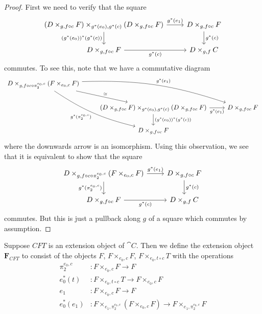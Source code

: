 \begin{proof}
First we need to verify that the square
\begin{equation*}
\begin{tikzcd}
(D\times_{g,f\circ c} F) \times_{g^\ast(e_0),g^\ast(c)} (D\times_{g,f\circ c} F)
  \ar{r}{g^\ast(e_1)} 
  \ar{d}[swap]{(g^\ast(e_0))^\ast(g^\ast(c))} 
  & 
D\times_{g,f\circ c} F
  \ar{d}{g^\ast(c)}
  \\
D\times_{g,f\circ c} F
  \ar{r}[swap]{g^\ast(c)} 
  & 
D\times_{g,f} C
\end{tikzcd}
\end{equation*}
commutes. To see this, note that we have a commutative diagram
\begin{equation*}
\begin{tikzcd}
D\times_{g,f\circ c\circ \pi_2^{e_0,c}}(F\times_{e_0,c} F)  
  \ar[bend right=10]{ddr}[swap]{g^\ast(\pi_2^{e_0,c})}
  \ar[bend left=10]{drr}{g^\ast(e_1)}
  \ar{dr}{\simeq}
  \\
  {}
  &
(D\times_{g,f\circ c} F)\times_{g^\ast(e_0),g^\ast(c)}(D\times_{g,f\circ c} F)
  \ar{r}[swap]{g^\ast(e_1)}
  \ar{d}{(g^\ast(e_0))^\ast(g^\ast(c))}
  &
  D\times_{g,f\circ c} F
  \\
  {}
  &
D\times_{g,f\circ c} F
  &
{}
\end{tikzcd}
\end{equation*}
where the downwards arrow is an isomorphism. Using this observation, we see that
it is equivalent to show that the square
\begin{equation*}
\begin{tikzcd}
D\times_{g,f\circ c\circ \pi_2^{e_0,c}}(F\times_{e_0,c} F)
  \ar{r}{g^\ast(e_1)} 
  \ar{d}[swap]{g^\ast(\pi_2^{e_0,c})} 
  & 
D\times_{g,f\circ c} F
  \ar{d}{g^\ast(c)}
  \\
D\times_{g,f\circ c} F
  \ar{r}[swap]{g^\ast(c)} 
  & 
D\times_{g,f} C
\end{tikzcd}
\end{equation*}
commutes. But this is just a pullback along $g$ of a square which commutes by assumption.
\end{proof}

\begin{defn}
Suppose $CFT$ is an extension object of $\cat{C}$. Then we define the extension object
$\mathbf{F}_{CFT}$ to consist of the objects $F$, $F\times_{e_0,c} F$, $F\times_{e_0,t\circ c} T$
with the operations
\begin{align*}
\pi_2^{e_0,c} & : F\times_{e_0,c} F\to F\\
e_0^\ast(t) & : F\times_{e_0,t\circ c} T\to F\times_{e_0,c} F\\
e_1 & : F\times_{e_0,c} F\to F\\
e_0^\ast(e_1) & : F\times_{e_1,\pi_2^{e_0,c}}(F\times_{e_0,c} F)\to F\times_{e_1,\pi_2^{e_0,c}} F
\end{align*}
\end{defn}

